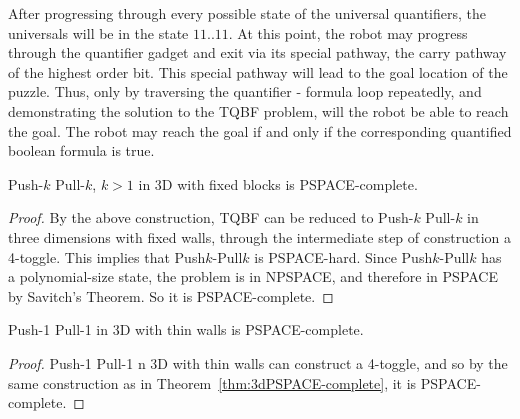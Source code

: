 After progressing through every possible state of the universal quantifiers, the universals will be in the
state $11 .. 11$. At this point, the robot may progress through the quantifier gadget and exit via its special
pathway,
the carry pathway of the highest order bit. This special pathway will lead to the goal location of the puzzle.
Thus, only by traversing the quantifier - formula loop repeatedly, and demonstrating the solution to the TQBF
problem,
will the robot be able to reach the goal. The robot may reach the goal if and only if the corresponding quantified
boolean formula is true.

\begin{theorem}
    \label{thm:3dPSPACE-complete}
    Push-$k$ Pull-$k$, $k>1$ in 3D with fixed blocks is PSPACE-complete.
\end{theorem}
\begin{proof}
By the above construction, TQBF can be reduced to Push-$k$ Pull-$k$ in three dimensions with fixed walls, through the intermediate step of construction a 4-toggle. This implies that Push$k$-Pull$k$ is PSPACE-hard.
Since Push$k$-Pull$k$ has a polynomial-size state, the problem is in NPSPACE, and therefore in PSPACE by Savitch's Theorem\cite{SAVITCH1970177}. So it is PSPACE-complete.
\end{proof}

\begin{theorem}
    Push-1 Pull-1 in 3D with thin walls is PSPACE-complete.
\end{theorem}
\begin{proof}
    Push-1 Pull-1 n 3D with thin walls can construct a 4-toggle, and so by the same construction as in Theorem~\ref{thm:3dPSPACE-complete}, it is PSPACE-complete.
\end{proof}
